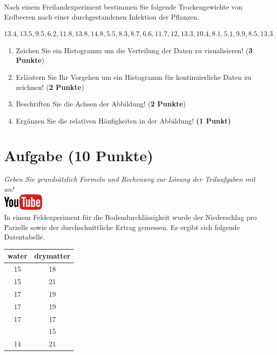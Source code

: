 \documentclass[a4paper, 9pt]{scrartcl}\usepackage[]{graphicx}\usepackage[]{xcolor}
\begin{document}
Nach einem Freilandexperiment bestimmen Sie folgende Trockengewichte von
Erdbeeren nach einer durchgestandenen Infektion der Pflanzen. 

\begin{center}
$13.4, 13.5, 9.5, 6.2, 11.8, 13.8, 14.8, 5.5, 8.3, 8.7, 6.6, 11.7, 12, 13.3, 10.4, 8.1, 5.1, 9.9, 8.5, 13.3$
\end{center}

\begin{enumerate}
\item Zeichen Sie ein Histogramm um die Verteilung der Daten zu
  visualisieren! (\textbf{3 Punkte})
 \item Erl{\"a}utern Sie Ihr Vorgehen um ein Histogramm f{\"u}r kontinuierliche
  Daten zu zeichnen!  (\textbf{2 Punkte})
\item Beschriften Sie die Achsen der Abbildung! (\textbf{2 Punkte})
\item Erg{\"a}nzen Sie die relativen H{\"a}ufigkeiten in der Abbildung! \textbf{(1
    Punkt)}  
\end{enumerate}

 
\clearpage

\section{Aufgabe \hfill (10 Punkte)}

\textit{Geben Sie grunds{\"a}tzlich Formeln und Rechenweg zur L{\"o}sung der
  Teilaufgaben mit an!} \\[1Ex]

\hfill\href{https://youtu.be/VAqiUdV4WQ0}{\includegraphics[width =
  2cm]{img/youtube}}\\[1Ex]

In einem Feldexperiment f{\"u}r die Bodendurchl{\"a}ssigkeit wurde der Niederschlag
pro Parzelle sowie der durchschnittliche Ertrag gemessen. Es ergibt sich
folgende Datentabelle. 

\begin{table}[!h]
\centering
\begin{tabular}{cc}
\toprule
water & drymatter\\
\midrule
15 & 18\\
15 & 21\\
17 & 19\\
17 & 19\\
17 & 17\\
\addlinespace
18 & 15\\
14 & 21\\
\bottomrule
\end{tabular}
\end{table}
\end{document}
